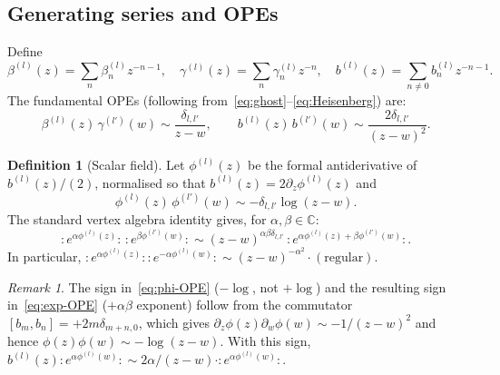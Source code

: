 \documentclass[12pt]{article}
\theoremstyle{plain}
\theoremstyle{definition}
\newtheorem{definition}[theorem]{Definition}
\theoremstyle{remark}
\newtheorem{remark}[theorem]{Remark}
\newcommand{\C}{\mathbb{C}}
\newcommand{\bl}[1]{\beta^{(#1)}}
\newcommand{\gl}[1]{\gamma^{(#1)}}
\newcommand{\OPE}{\sim}
\newcommand{\no}[1]{:\!#1\!:}
\begin{document}
\subsection{Generating series and OPEs}
Define
\begin{equation}\label{eq:series}
  \bl{l}(z)=\sum_n\bl{l}_nz^{-n-1},\quad
  \gl{l}(z)=\sum_n\gl{l}_nz^{-n},\quad
  b^{(l)}(z)=\sum_{n\neq 0}b^{(l)}_nz^{-n-1}.
\end{equation}
The fundamental OPEs (following from~\eqref{eq:ghost}--\eqref{eq:Heisenberg}) are:
\begin{equation}\label{eq:OPEs}
  \bl{l}(z)\,\gl{l'}(w)\OPE\frac{\delta_{l,l'}}{z-w},\qquad
  b^{(l)}(z)\,b^{(l')}(w)\OPE\frac{2\delta_{l,l'}}{(z-w)^2}.
\end{equation}
\begin{definition}[Scalar field]\label{def:phi}
  Let $\phi^{(l)}(z)$ be the formal antiderivative of $b^{(l)}(z)/(2)$,
  normalised so that $b^{(l)}(z)=2\partial_z\phi^{(l)}(z)$ and
  \begin{equation}\label{eq:phi-OPE}
    \phi^{(l)}(z)\,\phi^{(l')}(w)\OPE -\delta_{l,l'}\log(z-w).
  \end{equation}
  The standard vertex algebra identity gives, for $\alpha,\beta\in\C$:
  \begin{equation}\label{eq:exp-OPE}
    \no{e^{\alpha\phi^{(l)}(z)}}\,\no{e^{\beta\phi^{(l')}(w)}}
    \OPE (z-w)^{\alpha\beta\delta_{l,l'}}\,\no{e^{\alpha\phi^{(l)}(z)+\beta\phi^{(l')}(w)}}.
  \end{equation}
  In particular, $\no{e^{\alpha\phi^{(l)}(z)}}\no{e^{-\alpha\phi^{(l)}(w)}}
  \OPE (z-w)^{-\alpha^2}\cdot(\text{regular})$.
\end{definition}
\begin{remark}
  The sign in~\eqref{eq:phi-OPE} ($-\log$, not $+\log$) and the resulting
  sign in~\eqref{eq:exp-OPE} ($+\alpha\beta$ exponent) follow from the
  commutator $[b_m,b_n]=+2m\delta_{m+n,0}$, which gives
  $\partial_z\phi(z)\partial_w\phi(w)\OPE -1/(z-w)^2$ and hence
  $\phi(z)\phi(w)\OPE-\log(z-w)$.
  With this sign, $b^{(l)}(z)\no{e^{\alpha\phi^{(l)}(w)}}
  \OPE 2\alpha/(z-w)\cdot\no{e^{\alpha\phi^{(l)}(w)}}$.
\end{remark}
\end{document}
